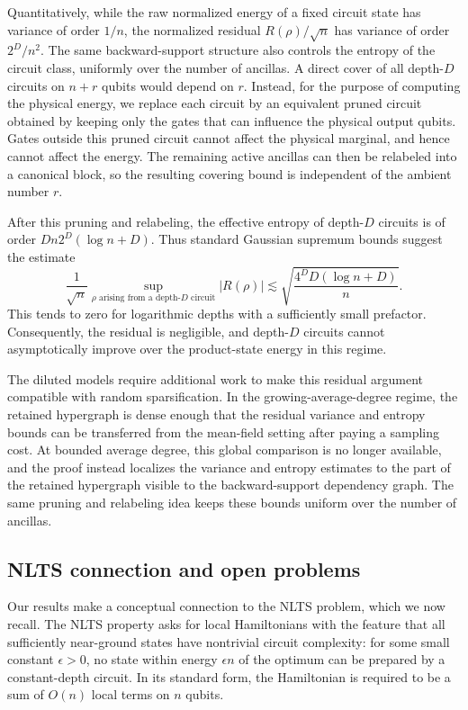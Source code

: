\documentclass[12pt]{article}
\begin{document}
Quantitatively, while the raw normalized energy of a fixed circuit state has variance of order $1/n$, the normalized residual $R(\rho)/\sqrt n$ has variance of order $2^D/n^2$. The same backward-support structure also controls the entropy of the circuit class, uniformly over the number of ancillas. A direct cover of all depth-$D$ circuits on $n+r$ qubits would depend on $r$. Instead,
for the purpose of computing the physical energy, we replace each circuit by an equivalent pruned circuit obtained by keeping only the gates that can influence the physical output qubits. Gates outside this pruned circuit cannot affect the physical marginal, and hence cannot affect the energy. The remaining active ancillas can then be relabeled into a canonical block, so the resulting covering bound is independent of the ambient number $r$.

After this pruning and relabeling, the effective entropy of depth-$D$ circuits is of order $Dn2^D(\log n+D)$. Thus standard Gaussian supremum bounds suggest the estimate
\[
    \frac{1}{\sqrt n}
    \sup_{\rho \text{ arising from a depth-}D\text{ circuit}}
    |R(\rho)|
    \lesssim
    \sqrt{\frac{4^D D(\log n+D)}{n}}.
\]
This tends to zero for logarithmic depths with a sufficiently small prefactor. Consequently, the residual is negligible, and depth-$D$ circuits cannot asymptotically improve over the product-state energy in this regime.


The diluted models require additional work to make this residual argument compatible with random sparsification. In the growing-average-degree regime, the retained hypergraph is dense enough that the residual variance and entropy bounds can be transferred from the mean-field setting after paying a sampling cost. At bounded average degree, this global comparison is no longer available, and the proof instead localizes the variance and entropy estimates
to the part of the retained hypergraph visible to the backward-support dependency graph. The same pruning and relabeling idea keeps these bounds uniform over the number of ancillas.


\subsection{NLTS connection and open problems}\label{ssec:NLTS-connection}
Our results make a conceptual connection to the NLTS problem, which we now recall. The NLTS property asks for local Hamiltonians with the feature that all sufficiently near-ground states have nontrivial circuit complexity: for some small constant $\epsilon>0$, no state within energy $\epsilon n$ of the optimum can be prepared by a constant-depth circuit. In its standard form, the Hamiltonian is required to be a sum of $O(n)$ local terms on $n$ qubits. 
\end{document}

